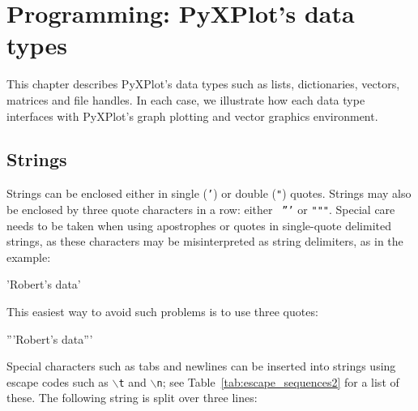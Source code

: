 %
%
%
%
%



\chapter{Programming: PyXPlot's data types}
\label{chap:progDataTypes}

This chapter describes PyXPlot's data types such as lists, dictionaries,
vectors, matrices and file handles.  In each case, we illustrate how each data
type interfaces with PyXPlot's graph plotting and vector graphics environment.

\section{Strings}
\label{sec:stringvars}

Strings can be enclosed either in single ({\tt '}) or double ({\tt "}) quotes.
Strings may also be enclosed by three quote characters in a row: either {\tt
'''} or {\tt """}. Special care needs to be taken when using apostrophes or
quotes in single-quote delimited strings, as these characters may be
misinterpreted as string delimiters, as in the example:

\begin{dontdo}
'Robert's data'
\end{dontdo}

\noindent This easiest way to avoid such problems is to use three quotes:

\begin{dodo}
'''Robert's data'''
\end{dodo}

Special characters such as tabs and newlines can be inserted into strings using
escape codes such as {\tt $\backslash$t} and {\tt $\backslash$n}; see
Table~\ref{tab:escape_sequences2} for a list of these. The following string is
split over three lines:

